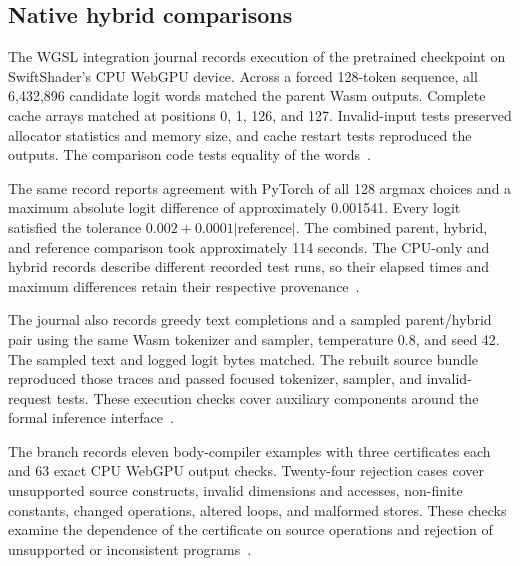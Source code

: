 \subsection{Native hybrid comparisons}

The WGSL integration journal records execution of the pretrained checkpoint on SwiftShader's CPU WebGPU device.  Across a forced 128-token sequence, all 6,432,896 candidate logit words matched the parent Wasm outputs.  Complete cache arrays matched at positions 0, 1, 126, and 127.  Invalid-input tests preserved allocator statistics and memory size, and cache restart tests reproduced the outputs.  The comparison code tests equality of the words~\cite{wg-journal,wg-tests}.

The same record reports agreement with PyTorch of all 128 argmax choices and a maximum absolute logit difference of approximately 0.001541.  Every logit satisfied the tolerance $0.002+0.0001|\text{reference}|$.  The combined parent, hybrid, and reference comparison took approximately 114 seconds.  The CPU-only and hybrid records describe different recorded test runs, so their elapsed times and maximum differences retain their respective provenance~\cite{wg-journal,wg-tests,tests}.

The journal also records greedy text completions and a sampled parent/hybrid pair using the same Wasm tokenizer and sampler, temperature 0.8, and seed 42.  The sampled text and logged logit bytes matched.  The rebuilt source bundle reproduced those traces and passed focused tokenizer, sampler, and invalid-request tests.  These execution checks cover auxiliary components around the formal inference interface~\cite{wg-journal}.

The branch records eleven body-compiler examples with three certificates each and 63 exact CPU WebGPU output checks.  Twenty-four rejection cases cover unsupported source constructs, invalid dimensions and accesses, non-finite constants, changed operations, altered loops, and malformed stores.  These checks examine the dependence of the certificate on source operations and rejection of unsupported or inconsistent programs~\cite{wg-bodytests}.
